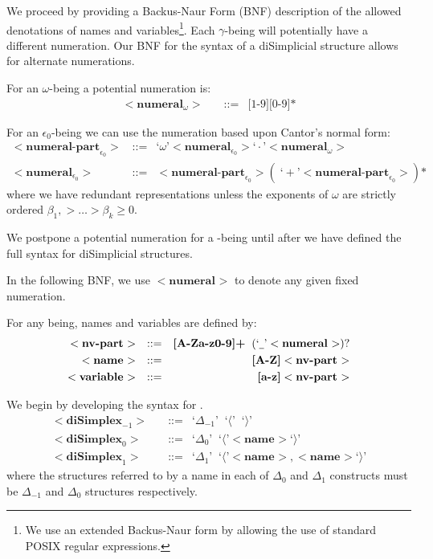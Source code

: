 \documentclass[a4paper,openany]{amsbook}
\begin{document}
We proceed by providing a Backus-Naur Form (BNF) description of the allowed
denotations of names and variables\footnote{We use an extended Backus-Naur form
by allowing the use of standard POSIX regular expressions.}. Each $\gamma$-being
will potentially have a different numeration. Our BNF for the syntax of a
diSimplicial structure allows for alternate numerations.

\newcommand{\bnf}[2]{\ensuremath{<\textbf{#1}_{#2}>}}
\newcommand{\bnfAssign}{\text{::=}}
\newcommand{\bnfT}[1]{\text{`}#1\text{'}}

For an $\omega$-being a potential numeration is:
%
\begin{align*}
%
\bnf{numeral}{\omega} \quad & \bnfAssign & \text{[1-9]}\text{[0-9]*}
%
\end{align*}
%

For an $\epsilon_0$-being we can use the numeration based upon Cantor's normal
form:
%
\begin{align*}
%
\bnf{numeral-part}{\epsilon_0} \quad & \bnfAssign & 
  \bnfT{\omega} \bnf{numeral}{\epsilon_0} \bnfT{\cdot} \bnf{numeral}{\omega} \\
%
\bnf{numeral}{\epsilon_0} \quad & \bnfAssign & 
  \bnf{numeral-part}{\epsilon_0} ( \; \bnfT{+} \bnf{numeral-part}{\epsilon_0} ) \text{*}
%
\end{align*}
%
where we have redundant representations unless the exponents of $\omega$ are
strictly ordered $\beta_1, > \ldots > \beta_k \ge 0$.

We postpone a potential numeration for a \Cardinal-being until after we have
defined the full syntax for diSimplicial structures.

In the following BNF, we use \bnf{numeral}{} to denote any given fixed
numeration.

For any being, names and variables are defined by:
%
\begin{align*}
%
\bnf{nv-part}{} \quad & \bnfAssign & 
  \textbf{[A-Za-z0-9]+} \;\; ( \bnfT{\underline{\hspace{1ex} }} \bnf{numeral}{} )\text{?} \\
%
\bnf{name}{} \quad & \bnfAssign & \textbf{[A-Z]} \bnf{nv-part}{} \\
%
\bnf{variable}{} \quad & \bnfAssign & \textbf{[a-z]} \bnf{nv-part}{}
%
\end{align*}

We begin by developing the syntax for .
%
\begin{align*}
%
\bnf{diSimplex}{-1} \quad & \bnfAssign & \bnfT{\Delta_{-1}} \;\; \bnfT{\langle} \;\; \bnfT{\rangle} \\
%
\bnf{diSimplex}{0} \quad & \bnfAssign & \bnfT{\Delta_0} \;\; \bnfT{\langle} \bnf{name}{} \bnfT{\rangle} \\
%
\bnf{diSimplex}{1} \quad & \bnfAssign & 
  \bnfT{\Delta_1} \;\; \bnfT{\langle} \bnf{name}{}, \bnf{name}{} \bnfT{\rangle}
%
\end{align*}
%
where the structures referred to by a name in each of $\Delta_0$ and $\Delta_1$
constructs must be $\Delta_{-1}$ and $\Delta_0$ structures respectively.
\end{document}
